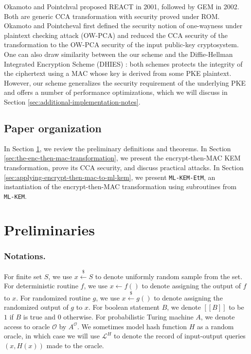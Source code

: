 \documentclass[runningheads]{llncs}
\newcommand{\leftsample}{\stackrel{\$}{\leftarrow}}
\newcommand{\llbrack}{[\![}
\newcommand{\rrbrack}{]\!]}
\begin{document}
Okamoto and Pointchval proposed REACT \cite{DBLP:conf/ctrsa/OkamotoP01} in 2001, followed by GEM \cite{DBLP:conf/ctrsa/CoronHJPPT02} in 2002. Both are generic CCA transformation with security proved under ROM. Okamoto and Pointcheval first defined the security notion of one-wayness under plaintext checking attack (OW-PCA) and reduced the CCA security of the transformation to the OW-PCA security of the input public-key cryptosystem. One can also draw similarity between the our scheme and the Diffie-Hellman Integrated Encryption Scheme (DHIES) \cite{DBLP:journals/iacr/AbdallaBR99,DBLP:conf/ctrsa/AbdallaBR01}: both schemes protects the integrity of the ciphertext using a MAC whose key is derived from some PKE plaintext. However, our scheme generalizes the security requirement of the underlying PKE and offers a number of performance optimizations, which we will discuss in Section \ref{sec:additional-implementation-notes}.

\subsection{Paper organization}\label{sec:paper-organization}
In Section \ref{sec:preliminaries}, we review the preliminary definitions and theorems. In Section \ref{sec:the-enc-then-mac-transformation}, we present the encrypt-then-MAC KEM transformation, prove its CCA security, and discuss practical attacks. In Section \ref{sec:applying-encrypt-then-mac-to-ml-kem}, we present \texttt{ML-KEM-EtM}, an instantiation of the encrypt-then-MAC transformation using subroutines from \texttt{ML-KEM}.

\section{Preliminaries}\label{sec:preliminaries}
\subsubsection{Notations.} For finite set $S$, we use $x \leftsample S$ to denote uniformly random sample from the set. For deterministic routine $f$, we use $x \leftarrow f()$ to denote assigning the output of $f$ to $x$. For randomized routine $g$, we use $x \leftsample g()$ to denote assigning the randomized output of $g$ to $x$. For boolean statement $B$, we denote $\llbrack B \rrbrack$ to be $1$ if $B$ is true and $0$ otherwise. For probabilistic Turing machine $A$, we denote access to oracle $\mathcal{O}$ by $A^\mathcal{O}$. We sometimes model hash function $H$ as a random oracle, in which case we will use $\mathcal{L}^H$ to denote the record of input-output queries $(x, H(x))$ made to the oracle.
\end{document}
